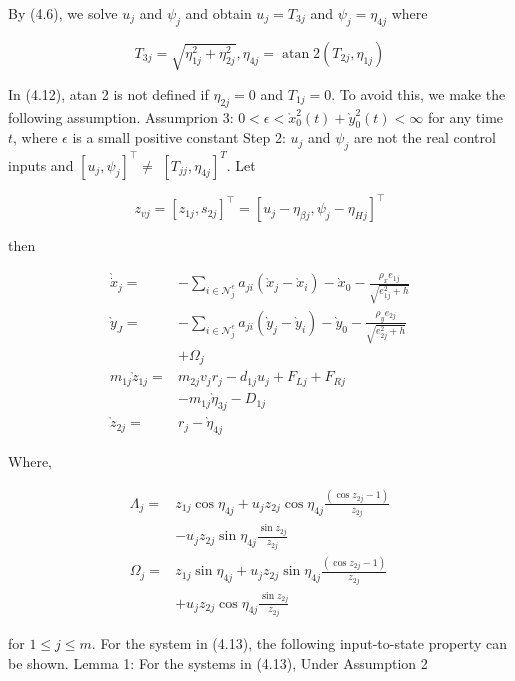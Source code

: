 \documentclass[10pt]{article}
\begin{document}
By (4.6), we solve $u_{j}$ and $\psi_{j}$ and obtain $u_{j}=T_{3 j}$ and $\psi_{j}=\eta_{4 j}$ where

$$
T_{3 j}=\sqrt{\eta_{1 j}^{2}+\eta_{2 j}^{2}}, \eta_{4 j}=\operatorname{atan} 2\left(T_{2 j}, \eta_{1 j}\right)
$$

In (4.12), atan 2 is not defined if $\eta_{2 j}=0$ and $T_{1 j}=0$. To avoid this, we make the following assumption. Assumprion 3: $0<\epsilon<\grave{x}_{0}^{2}(t)+\grave{y}_{0}^{2}(t)<\infty$ for any time $t$, where $\epsilon$ is a small positive constant Step 2: $u_{j}$ and $\psi_{j}$ are not the real control inputs and $\left[u_{j}, \psi_{j}\right]^{\top} \neq$ $\left[T_{j j}, \eta_{4 j}\right]^{T}$. Let

$$
z_{v j}=\left[z_{1 j}, s_{2 j}\right]^{\top}=\left[u_{j}-\eta_{\beta j}, \psi_{j}-\eta_{H j}\right]^{\top}
$$

then

$$
\begin{aligned}
\grave{\dot{x}}_{j}= & -\sum_{i \in \mathcal{N}_{j}^{e}} a_{j i}\left(\grave{x}_{j}-\grave{x}_{i}\right)-\grave{x}_{0}-\frac{\rho_{x} e_{1 j}}{\sqrt{e_{1 j}^{2}+h}} \\
\grave{y}_{J}= & -\sum_{i \in \mathcal{N}_{j}^{e}} a_{j i}\left(\grave{y}_{j}-\grave{y}_{i}\right)-\grave{y}_{0}-\frac{\rho_{y} e_{2 j}}{\sqrt{e_{2 j}^{2}+h}} \\
& +\Omega_{j} \\
m_{1 j} \grave{z}_{1 j}= & m_{2 j} v_{j} r_{j}-d_{1 j} u_{j}+F_{L j}+F_{R j} \\
& -m_{1 j} \grave{\eta}_{3 j}-D_{1 j} \\
\grave{z}_{2 j}= & r_{j}-\grave{\eta}_{4 j}
\end{aligned}
$$

Where,

$$
\begin{aligned}
\Lambda_{j}= & z_{1 j} \cos \eta_{4 j}+u_{j} z_{2 j} \cos \eta_{4 j} \frac{\left(\cos z_{2 j}-1\right)}{z_{2 j}} \\
& -u_{j} z_{2 j} \sin \eta_{4 j} \frac{\sin z_{2 j}}{z_{2 j}} \\
\Omega_{j}= & z_{1 j} \sin \eta_{4 j}+u_{j} z_{2 j} \sin \eta_{4 j} \frac{\left(\cos z_{2 j}-1\right)}{z_{2 j}} \\
& +u_{j} z_{2 j} \cos \eta_{4 j} \frac{\sin z_{2 j}}{z_{2 j}}
\end{aligned}
$$

for $1 \leq j \leq m$. For the system in (4.13), the following input-to-state property can be shown. Lemma 1: For the systems in (4.13), Under Assumption 2
\end{document}
